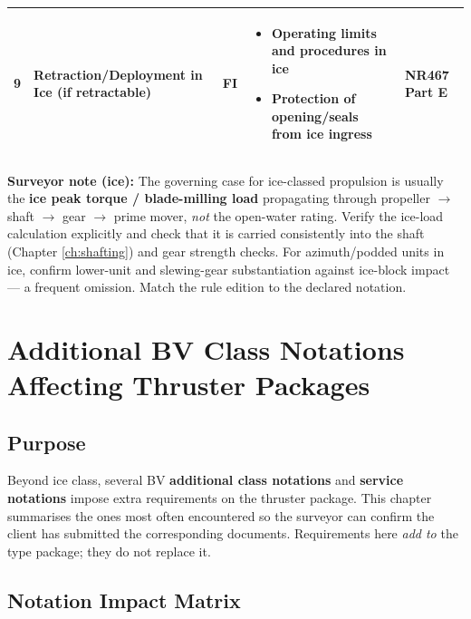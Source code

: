 \documentclass[11pt,a4paper]{report}
\newcommand{\fic}{\textbf{\textcolor{bvgray}{FI}}}
\begin{document}
\begin{longtable}{|p{0.5cm}|p{5cm}|p{1.5cm}|p{5.5cm}|p{2cm}|}
9 & Retraction/Deployment in Ice (if retractable) & \fic{} &
\begin{itemize}[leftmargin=*,nosep]
\item Operating limits and procedures in ice
\item Protection of opening/seals from ice ingress
\end{itemize} & NR467 Part E \\
\hline

\end{longtable}

\noindent\textbf{Surveyor note (ice):} The governing case for ice-classed
propulsion is usually the \textbf{ice peak torque / blade-milling load}
propagating through propeller $\rightarrow$ shaft $\rightarrow$ gear
$\rightarrow$ prime mover, \emph{not} the open-water rating. Verify the ice-load
calculation explicitly and check that it is carried consistently into the shaft
(Chapter \ref{ch:shafting}) and gear strength checks. For azimuth/podded units in
ice, confirm lower-unit and slewing-gear substantiation against ice-block impact
--- a frequent omission. Match the rule edition to the declared notation.

\newpage

\chapter{Additional BV Class Notations Affecting Thruster Packages}
\label{ch:notations}

\section{Purpose}

Beyond ice class, several BV \textbf{additional class notations} and
\textbf{service notations} impose extra requirements on the thruster package.
This chapter summarises the ones most often encountered so the surveyor can
confirm the client has submitted the corresponding documents. Requirements here
\emph{add to} the type package; they do not replace it.

\section{Notation Impact Matrix}
\end{document}
